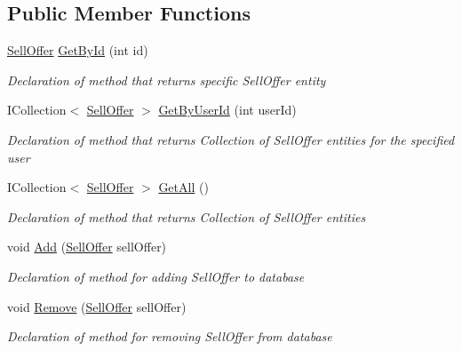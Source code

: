 \subsection*{Public Member Functions}
\begin{DoxyCompactItemize}
\item 
\mbox{\hyperlink{class_gielda_l2_1_1_d_b_1_1_entities_1_1_sell_offer}{Sell\+Offer}} \mbox{\hyperlink{interface_gielda_l2_1_1_d_b_1_1_interfaces_1_1_i_sell_offer_repository_aded9f3b24232b67af3c898689fe5d3ac}{Get\+By\+Id}} (int id)
\begin{DoxyCompactList}\small\item\em Declaration of method that returns specific Sell\+Offer entity \end{DoxyCompactList}\item 
I\+Collection$<$ \mbox{\hyperlink{class_gielda_l2_1_1_d_b_1_1_entities_1_1_sell_offer}{Sell\+Offer}} $>$ \mbox{\hyperlink{interface_gielda_l2_1_1_d_b_1_1_interfaces_1_1_i_sell_offer_repository_a97f7d41b71fcbcb6c255ec3267beda01}{Get\+By\+User\+Id}} (int user\+Id)
\begin{DoxyCompactList}\small\item\em Declaration of method that returns Collection of Sell\+Offer entities for the specified user \end{DoxyCompactList}\item 
I\+Collection$<$ \mbox{\hyperlink{class_gielda_l2_1_1_d_b_1_1_entities_1_1_sell_offer}{Sell\+Offer}} $>$ \mbox{\hyperlink{interface_gielda_l2_1_1_d_b_1_1_interfaces_1_1_i_sell_offer_repository_a9d5a9662923804caeedb86878a8635f7}{Get\+All}} ()
\begin{DoxyCompactList}\small\item\em Declaration of method that returns Collection of Sell\+Offer entities \end{DoxyCompactList}\item 
void \mbox{\hyperlink{interface_gielda_l2_1_1_d_b_1_1_interfaces_1_1_i_sell_offer_repository_a18f7f7c3a677e89bdc055a6b4a6a248a}{Add}} (\mbox{\hyperlink{class_gielda_l2_1_1_d_b_1_1_entities_1_1_sell_offer}{Sell\+Offer}} sell\+Offer)
\begin{DoxyCompactList}\small\item\em Declaration of method for adding Sell\+Offer to database \end{DoxyCompactList}\item 
void \mbox{\hyperlink{interface_gielda_l2_1_1_d_b_1_1_interfaces_1_1_i_sell_offer_repository_ab77d59db7295ed7a3c7457f8cc0d84d2}{Remove}} (\mbox{\hyperlink{class_gielda_l2_1_1_d_b_1_1_entities_1_1_sell_offer}{Sell\+Offer}} sell\+Offer)
\begin{DoxyCompactList}\small\item\em Declaration of method for removing Sell\+Offer from database \end{DoxyCompactList}\end{DoxyCompactItemize}
